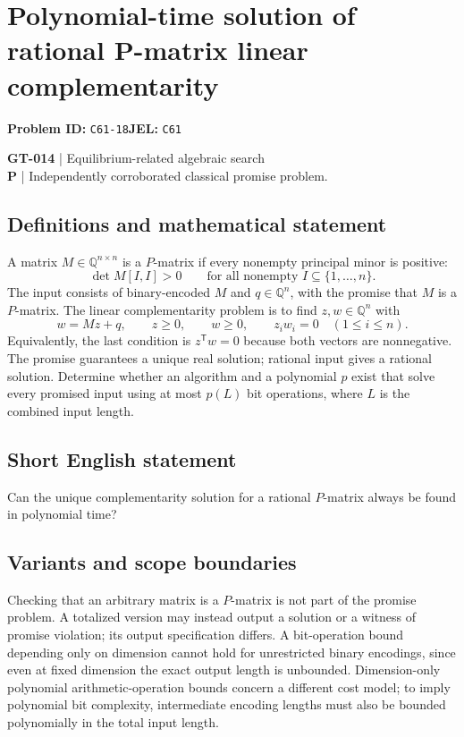 \documentclass[11pt,a4paper]{article}
\begin{document}
\section*{Polynomial-time solution of rational P-matrix linear complementarity}
\textbf{Problem ID:} \texttt{C61-18}\quad \textbf{JEL:} \texttt{C61}\par
\label{problem:OP-0144}
\label{game:GT-014}
{\sffamily\small\color{muted}
\textbf{GT-014} | Equilibrium-related algebraic search\\
\textbf{P} | Independently corroborated classical promise problem.
\par}
\subsection*{Definitions and mathematical statement}
A matrix $M\in\mathbb Q^{n\times n}$ is a $P$-matrix if every nonempty principal minor is positive:
\[
 \det M[I,I]>0\qquad\text{for all nonempty }I\subseteq\{1,\ldots,n\}.
\]
The input consists of binary-encoded $M$ and $q\in\mathbb Q^n$, with the promise that $M$ is a $P$-matrix. The linear complementarity problem is to find $z,w\in\mathbb Q^n$ with
\[
 w=Mz+q,\qquad z\geq0,\qquad w\geq0,\qquad
 z_iw_i=0\quad(1\leq i\leq n).
\]
Equivalently, the last condition is $z^{\mathsf T}w=0$ because both vectors are nonnegative. The promise guarantees a unique real solution; rational input gives a rational solution. Determine whether an algorithm and a polynomial $p$ exist that solve every promised input using at most $p(L)$ bit operations, where $L$ is the combined input length.
\subsection*{Short English statement}
Can the unique complementarity solution for a rational $P$-matrix always be found in polynomial time?
\subsection*{Variants and scope boundaries}
Checking that an arbitrary matrix is a $P$-matrix is not part of the promise problem. A totalized version may instead output a solution or a witness of promise violation; its output specification differs. A bit-operation bound depending only on dimension cannot hold for unrestricted binary encodings, since even at fixed dimension the exact output length is unbounded. Dimension-only polynomial arithmetic-operation bounds concern a different cost model; to imply polynomial bit complexity, intermediate encoding lengths must also be bounded polynomially in the total input length.
\end{document}
